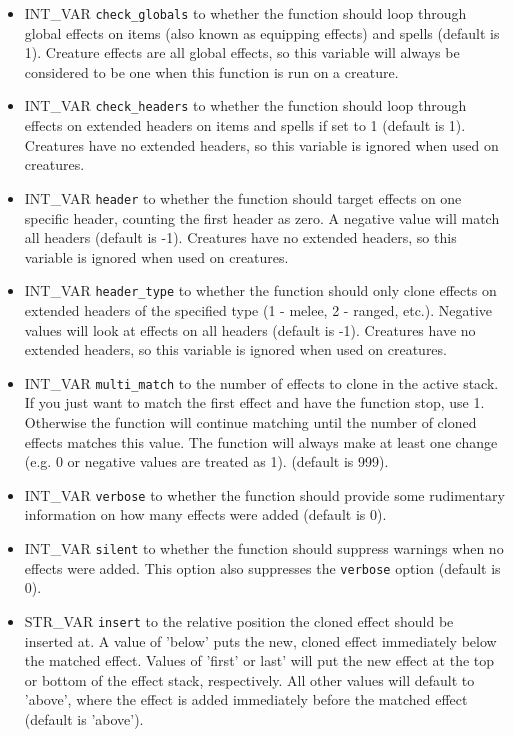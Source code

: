 \documentclass{article}
\def\t#1{{\tt #1}}
\begin{document}
\begin{itemize}
\item INT_VAR \verb+check_globals+ to whether the function should loop through global effects on items (also known as equipping effects) and spells (default is 1). Creature effects are all global effects, so this variable will always be considered to be one when this function is run on a creature.
\item INT_VAR \verb+check_headers+ to whether the function should loop through effects on extended headers on items and spells if set to 1 (default is 1). Creatures have no extended headers, so this variable is ignored when used on creatures.
\item INT_VAR \verb+header+ to whether the function should target effects on one specific header, counting the first header as zero. A negative value will match all headers (default is -1). Creatures have no extended headers, so this variable is ignored when used on creatures.
\item INT_VAR \verb+header_type+ to whether the function should only clone effects on extended headers of the specified type (1 - melee, 2 - ranged, etc.). Negative values will look at effects on all headers (default is -1). Creatures have no extended headers, so this variable is ignored when used on creatures.
\item INT_VAR \verb+multi_match+ to the number of effects to clone in the active stack. If you just want to match the first effect and have the function stop, use 1. Otherwise the function will continue matching until the number of cloned effects matches this value. The function will always make at least one change (e.g. 0 or negative values are treated as 1). (default is 999).
\item INT_VAR \verb+verbose+ to whether the function should provide some rudimentary information on how many effects were added (default is 0).
\item INT_VAR \verb+silent+ to whether the function should suppress warnings when no effects were added. This option also suppresses the \t{verbose} option (default is 0).
\item STR_VAR \verb+insert+ to the relative position the cloned effect should be inserted at. A value of 'below' puts the new, cloned effect immediately below the matched effect. Values of 'first' or last' will put the new effect at the top or bottom of the effect stack, respectively. All other values will default to 'above', where the effect is added immediately before the matched effect (default is 'above').
\end{itemize}
\end{document}
